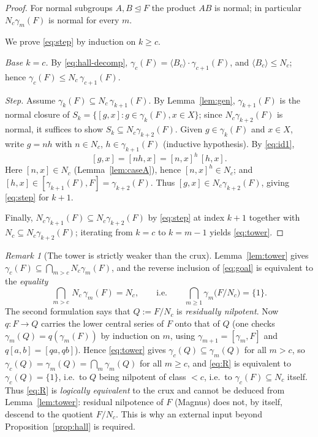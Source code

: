 \documentclass{amsart}
\theoremstyle{definition}
\theoremstyle{remark}
\newtheorem{remark}{Remark}
\begin{document}
\begin{proof}
For normal subgroups $A,B\trianglelefteq F$ the product $AB$ is normal; in
particular $N_c\gamma_m(F)$ is normal for every $m$.

We prove \eqref{eq:step} by induction on $k\ge c$.

\emph{Base $k=c$.} By \eqref{eq:hall-decomp}, $\gamma_c(F)=\langle B_c\rangle\cdot\gamma_{c+1}(F)$,
and $\langle B_c\rangle\le N_c$; hence $\gamma_c(F)\le N_c\,\gamma_{c+1}(F)$.

\emph{Step.} Assume $\gamma_k(F)\subseteq N_c\,\gamma_{k+1}(F)$. By
Lemma~\ref{lem:gen}, $\gamma_{k+1}(F)$ is the normal closure of
$S_k=\{[g,x]:g\in\gamma_k(F),x\in X\}$; since $N_c\gamma_{k+2}(F)$ is normal, it
suffices to show $S_k\subseteq N_c\gamma_{k+2}(F)$. Given $g\in\gamma_k(F)$ and
$x\in X$, write $g=n h$ with $n\in N_c$, $h\in\gamma_{k+1}(F)$ (inductive
hypothesis). By \eqref{eq:id1},
\[
[g,x]=[nh,x]=[n,x]^{h}\,[h,x].
\]
Here $[n,x]\in N_c$ (Lemma~\ref{lem:caseA}), hence $[n,x]^{h}\in N_c$; and
$[h,x]\in[\gamma_{k+1}(F),F]=\gamma_{k+2}(F)$. Thus $[g,x]\in N_c\gamma_{k+2}(F)$,
giving \eqref{eq:step} for $k+1$.

Finally, $N_c\gamma_{k+1}(F)\subseteq N_c\gamma_{k+2}(F)$ by \eqref{eq:step} at
index $k+1$ together with $N_c\subseteq N_c\gamma_{k+2}(F)$; iterating from $k=c$
to $k=m-1$ yields \eqref{eq:tower}.
\end{proof}

\begin{remark}[The tower is strictly weaker than the crux]\label{rem:gap}
Lemma~\ref{lem:tower} gives
$\gamma_c(F)\subseteq\bigcap_{m>c}N_c\gamma_m(F)$, and the reverse inclusion of
\eqref{eq:goal} is equivalent to the \emph{equality}
\begin{equation}\label{eq:R}
\bigcap_{m>c}\,N_c\,\gamma_m(F)=N_c,
\qquad\text{i.e.}\qquad
\bigcap_{m\ge1}\gamma_m\!\big(F/N_c\big)=\{1\}.
\end{equation}
The second formulation says that $Q:=F/N_c$ is \emph{residually nilpotent}. Now
$q\colon F\to Q$ carries the lower central series of $F$ onto that of $Q$ (one
checks $\gamma_m(Q)=q(\gamma_m(F))$ by induction on $m$, using
$\gamma_{m+1}=[\gamma_m,F]$ and $q[a,b]=[qa,qb]$). Hence \eqref{eq:tower} gives
$\gamma_c(Q)\subseteq\gamma_m(Q)$ for all $m>c$, so
$\gamma_c(Q)=\gamma_m(Q)=\bigcap_{m}\gamma_m(Q)$ for all $m\ge c$, and
\eqref{eq:R} is equivalent to $\gamma_c(Q)=\{1\}$, i.e.\ to $Q$ being nilpotent of
class $<c$, i.e.\ to $\gamma_c(F)\subseteq N_c$ itself. Thus \eqref{eq:R} is
\emph{logically equivalent} to the crux and cannot be deduced from
Lemma~\ref{lem:tower}: residual nilpotence of $F$ (Magnus) does not, by itself,
descend to the quotient $F/N_c$. This is why an external input beyond
Proposition~\ref{prop:hall} is required.
\end{remark}
\end{document}
